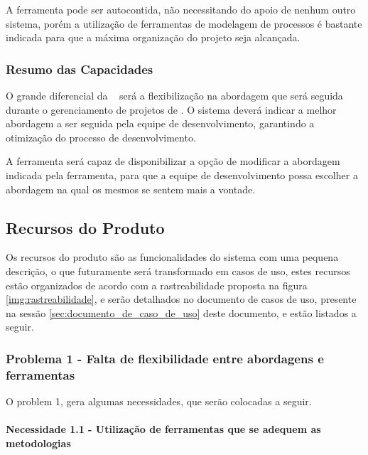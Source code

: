 A ferramenta pode ser autocontida, não necessitando do apoio de nenhum outro sistema, porém a utilização de ferramentas de modelagem de processos é bastante indicada para que a máxima organização do projeto seja alcançada.

\subsubsection{Resumo das Capacidades}
	
O grande diferencial da \nomeferramenta~ será a flexibilização na abordagem que será seguida durante o gerenciamento de projetos de \sw. O sistema deverá indicar a melhor abordagem a ser seguida pela equipe de desenvolvimento, garantindo a otimização do processo de desenvolvimento.

A ferramenta será capaz de disponibilizar a opção de modificar a abordagem indicada pela ferramenta, para que a equipe de desenvolvimento possa escolher a abordagem na qual os mesmos se sentem mais a vontade.

\subsection{Recursos do Produto}
\label{subsub:recursos_produto}

Os recursos do produto são as funcionalidades do sistema com uma pequena descrição, o que futuramente será transformado em casos de uso, estes recursos estão organizados de acordo com a rastreabilidade proposta na figura \ref{img:rastreabilidade}, e serão detalhados no documento de casos de uso, presente na sessão \ref{sec:documento_de_caso_de_uso} deste documento, e estão listados a seguir.

\subsubsection{Problema 1 - Falta de flexibilidade entre abordagens e ferramentas}

O problem 1, gera algumas necessidades, que serão colocadas a seguir.

\paragraph{Necessidade 1.1 - Utilização de ferramentas que se adequem as metodologias\\}

